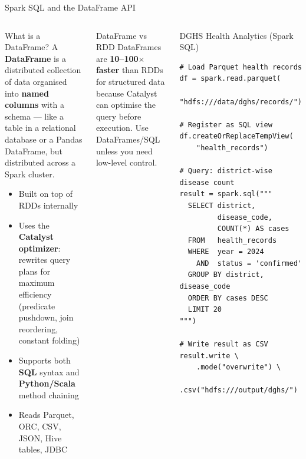 \documentclass[aspectratio=169,10pt]{beamer}
\begin{document}
\begin{frame}[fragile]{Spark SQL and the DataFrame API}
  \begin{columns}[T]
      \begin{block}{What is a DataFrame?}
        A \textbf{DataFrame} is a distributed collection of data organised into \textbf{named columns} with a schema — like a table in a relational database or a Pandas DataFrame, but distributed across a Spark cluster.
        \vspace{4pt}
        \begin{itemize}
          \item Built on top of RDDs internally
          \item Uses the \textbf{Catalyst optimizer}: rewrites query plans for maximum efficiency (predicate pushdown, join reordering, constant folding)
          \item Supports both \textbf{SQL} syntax and \textbf{Python/Scala} method chaining
          \item Reads Parquet, ORC, CSV, JSON, Hive tables, JDBC
        \end{itemize}
      \end{block}
      \vspace{4pt}
      \begin{alertblock}{DataFrame vs RDD}
        \small DataFrames are \textbf{10--100$\times$ faster} than RDDs for structured data because Catalyst can optimise the query before execution.  Use DataFrames/SQL unless you need low-level control.
      \end{alertblock}

      \begin{exampleblock}{DGHS Health Analytics (Spark SQL)}
        \begin{lstlisting}
# Load Parquet health records
df = spark.read.parquet(
    "hdfs:///data/dghs/records/")

# Register as SQL view
df.createOrReplaceTempView(
    "health_records")

# Query: district-wise disease count
result = spark.sql("""
  SELECT district,
         disease_code,
         COUNT(*) AS cases
  FROM   health_records
  WHERE  year = 2024
    AND  status = 'confirmed'
  GROUP BY district, disease_code
  ORDER BY cases DESC
  LIMIT 20
""")

# Write result as CSV
result.write \
    .mode("overwrite") \
    .csv("hdfs:///output/dghs/")
        \end{lstlisting}
      \end{exampleblock}
  \end{columns}
\end{frame}
\end{document}
